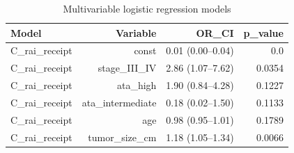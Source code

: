 \begin{table}[htbp]
\centering
\caption{Multivariable logistic regression models}
\label{tab:logistic_models}
\begin{tabular}{lrrr}
\toprule
Model & Variable & OR\_CI & p\_value \\
\midrule
C\_rai\_receipt & const & 0.01 (0.00--0.04) & 0.0 \\
C\_rai\_receipt & stage\_III\_IV & 2.86 (1.07--7.62) & 0.0354 \\
C\_rai\_receipt & ata\_high & 1.90 (0.84--4.28) & 0.1227 \\
C\_rai\_receipt & ata\_intermediate & 0.18 (0.02--1.50) & 0.1133 \\
C\_rai\_receipt & age & 0.98 (0.95--1.01) & 0.1789 \\
C\_rai\_receipt & tumor\_size\_cm & 1.18 (1.05--1.34) & 0.0066 \\
\bottomrule
\end{tabular}
\end{table}